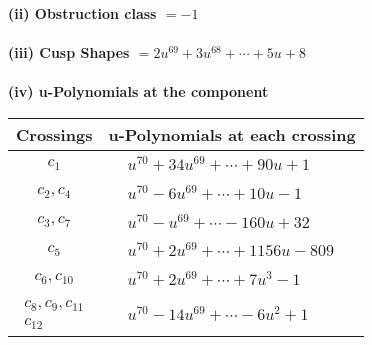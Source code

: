\documentclass[1p]{elsarticle_modified}
\theoremstyle{definition}
\begin{document}
\flushleft \textbf{(ii) Obstruction class $= -1$}\\~\\
\flushleft \textbf{(iii) Cusp Shapes $= 2 u^{69}+3 u^{68}+\cdots+5 u+8$}\\~\\
\newpage\renewcommand{\arraystretch}{1}
\flushleft \textbf{(iv) u-Polynomials at the component}\newline \\
\begin{tabular}{m{50pt}|m{274pt}}
Crossings & \hspace{64pt}u-Polynomials at each crossing \\
\hline $$\begin{aligned}c_{1}\end{aligned}$$&$\begin{aligned}
&u^{70}+34 u^{69}+\cdots+90 u+1
\end{aligned}$\\
\hline $$\begin{aligned}c_{2},c_{4}\end{aligned}$$&$\begin{aligned}
&u^{70}-6 u^{69}+\cdots+10 u-1
\end{aligned}$\\
\hline $$\begin{aligned}c_{3},c_{7}\end{aligned}$$&$\begin{aligned}
&u^{70}- u^{69}+\cdots-160 u+32
\end{aligned}$\\
\hline $$\begin{aligned}c_{5}\end{aligned}$$&$\begin{aligned}
&u^{70}+2 u^{69}+\cdots+1156 u-809
\end{aligned}$\\
\hline $$\begin{aligned}c_{6},c_{10}\end{aligned}$$&$\begin{aligned}
&u^{70}+2 u^{69}+\cdots+7 u^3-1
\end{aligned}$\\
\hline $$\begin{aligned}c_{8},c_{9},c_{11}\\c_{12}\end{aligned}$$&$\begin{aligned}
&u^{70}-14 u^{69}+\cdots-6 u^2+1
\end{aligned}$\\
\hline
\end{tabular}\\~\\
\end{document}
